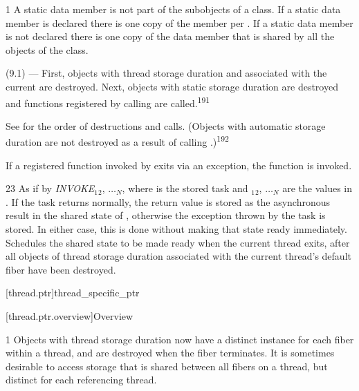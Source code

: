 \documentclass[fontsize=10pt,paper=A4,pagesize,DIV=15]{scrartcl}
\begin{document}
1 A static data member is not part of the subobjects of a class. If a
static data member is declared  there is one copy of
the member per . If a static data member is not declared
 there is one copy of the data member that is shared by all
the objects of the class.


(9.1) --- First, objects with thread storage duration and associated with the current
are destroyed. Next, objects with static storage duration are destroyed
and functions registered by calling
are called.\textsuperscript{191}

See  for the order of destructions and calls.
(Objects with automatic storage duration are not destroyed as a result of calling
.)\textsuperscript{192}

If a registered function invoked by  exits via an exception,
the function  is invoked.


23 \effects
As if by \emph{INVOKE}$_1$$_2$, $\dotsc$$_N$\cpp{)},
where  is the stored task and
$_1$$_2$, $\dotsc$$_N$ are the values in . If the task returns normally,
the return value is stored as the asynchronous result in the shared state of
\this, otherwise the exception thrown by the task is stored. In either
case, this is done without making that state ready immediately. Schedules
the shared state to be made ready when the current thread exits,
after all objects of thread storage duration associated with the current 
{thread's default fiber} have been destroyed.


\setcounter{section}{33}
\setcounter{subsection}{12}
\setcounter{secnumdepth}{4}

\cbstart

[thread.ptr]{thread\_specific\_ptr}

[thread.ptr.overview]{Overview}

1 Objects with thread storage duration now have a distinct instance for each
fiber within a thread, and are destroyed when the fiber terminates. It is
sometimes desirable to access storage that is shared between all fibers on a
thread, but distinct for each referencing thread.
\end{document}
